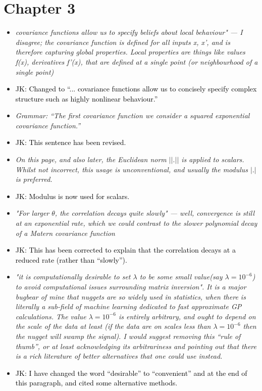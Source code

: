 \documentclass[12pt]{article}
\newcommand{\done}[2]{\item[#1]\textit{#2}}
\newcommand{\jack}[1]{\item{\textcolor{black}{JK: #1}}}
\begin{document}
\section{Chapter 3}
\begin{itemize}
\done{P30}{covariance functions allow us to specify beliefs about local behaviour" --- I disagree; the covariance function is defined for all inputs x, x’, and is therefore capturing global properties.  Local properties are things like values f(x), derivatives f’(x), that are defined at a single point (or neighbourhood of a single point)}

\jack{Changed to ``... covariance functions allow us to concisely specify complex structure such as highly nonlinear behaviour.''}

\done{P31}{Grammar:  ``The first covariance function we consider a squared exponential covariance function.''}
\jack{This sentence has been revised.}

\done{P31}{On this page, and also later, the Euclidean norm $||.||$ is applied to scalars.  Whilst not incorrect, this usage is unconventional, and usually the modulus $|.|$ is preferred.}

\jack{Modulus is now used for scalars.}

\done{P31}{"For larger $\theta$, the correlation decays quite slowly" --- well, convergence is still at an exponential rate, which we could contrast to the slower polynomial decay of a Matern covariance function}

\jack{This has been corrected to explain that the correlation decays at a reduced rate (rather than ``slowly'').}

\done{P37}{"it is computationally desirable to set $\lambda$ to be some small value(say $\lambda= 10^{-6}$) to avoid computational issues surrounding matrix inversion".  It is a major bugbear of mine that nuggets are so widely used in statistics, when there is literally a sub-field of machine learning dedicated to fast approximate GP calculations.  The value $\lambda= 10^{-6}$ is entirely arbitrary, and ought to depend on the scale of the data at least (if the data are on scales less than $\lambda = 10^{-6}$ then the nugget will swamp the signal).  I would suggest removing this ``rule of thumb'', or at least acknowledging its arbitrariness and pointing out that there is a rich literature of better alternatives that one could use instead.}

\jack{I have changed the word ``desirable'' to ``convenient'' and at the end of this paragraph, and cited some alternative methods.}


\end{itemize}
\end{document}

